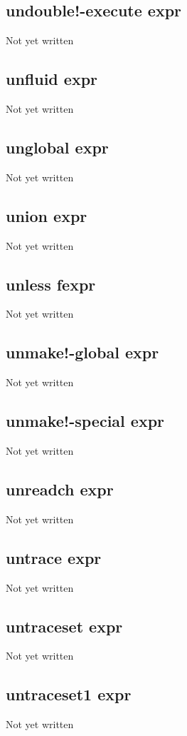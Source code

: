 \documentclass[a4paper,11pt]{article}
\begin{document}
\subsection{\ttfamily undouble!-execute expr}
Not yet written

\subsection{\ttfamily unfluid expr}
Not yet written

\subsection{\ttfamily unglobal expr}
Not yet written

\subsection{\ttfamily union expr}
Not yet written

\subsection{\ttfamily unless fexpr}
Not yet written

\subsection{\ttfamily unmake!-global expr}
Not yet written

\subsection{\ttfamily unmake!-special expr}
Not yet written

\subsection{\ttfamily unreadch expr}
Not yet written

\subsection{\ttfamily untrace expr}
Not yet written

\subsection{\ttfamily untraceset expr}
Not yet written

\subsection{\ttfamily untraceset1 expr}
Not yet written
\end{document}
